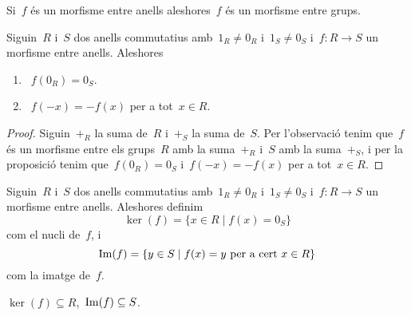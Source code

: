 \documentclass[../../main.tex]{subfiles}
\begin{document}
    \begin{observation}
        \label{obs:morfisme entre anells és morfisme entre grups}
        Si~\(f\) és un morfisme entre anells aleshores~\(f\) és un morfisme entre grups.
    \end{observation}
    \begin{proposition}
        \label{prop:propietats morfismes entre anells}
            Siguin~\(R\) i~\(S\) dos anells commutatius amb~\(1_{R}\neq0_{R}\) i~\(1_{S}\neq0_{S}\) i~\(f\colon R\longrightarrow S\) un morfisme entre anells.
            Aleshores
        \begin{enumerate}
            \item~\(f(0_{R})=0_{S}\).
            \item~\(f(-x)=-f(x)\) per a tot~\(x\in R\).
        \end{enumerate}
        \begin{proof}
            Siguin~\(+_{R}\) la suma de~\(R\) i~\(+_{S}\) la suma de~\(S\).
            Per l'observació  tenim que~\(f\) és un morfisme entre els grups~\(R\) amb la suma~\(+_{R}\) i~\(S\) amb la suma~\(+_{S}\), i per la proposició  tenim que~\(f(0_{R})=0_{S}\) i~\(f(-x)=-f(x)\) per a tot~\(x\in R\).
        \end{proof}
    \end{proposition}
    \begin{definition}
        \label{def:nucli d'un morfisme entre anells}
        \label{def:imatge d'un morfisme entre anells}
        Siguin~\(R\) i~\(S\) dos anells commutatius amb~\(1_{R}\neq0_{R}\) i~\(1_{S}\neq0_{S}\) i~\(f\colon R\longrightarrow S\) un morfisme entre anells.
        Aleshores definim
        \[
            \ker(f)=\{x\in R\mid f(x)=0_{S}\}
        \]
        com el nucli de~\(f\), i
        \[
            \operatorname{Im}(f)=\{y\in S\mid f(x)=y\text{ per a cert }x\in R\}
        \]
        com la imatge de~\(f\).
    \end{definition}
    \begin{observation}
        \label{obs:nucli d'un morfisme entre anells es subconjunt del grup d'entrada, imatge n'és del de sortida}
        \(\ker(f)\subseteq R\),~\(\operatorname{Im}(f)\subseteq S\).
    \end{observation}
\end{document}
